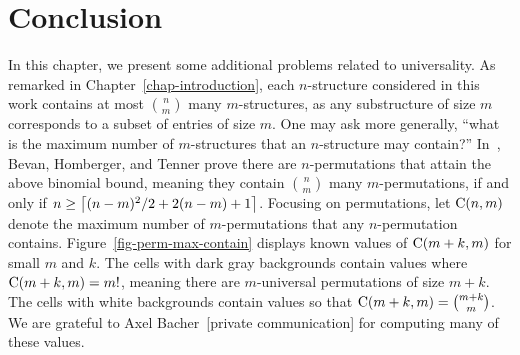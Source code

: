 \chapter{Conclusion}
\label{chap-conclusion}

In this chapter, we present some additional problems related to universality. As remarked in Chapter~\ref{chap-introduction}, each $n$-structure considered in this work contains at most $\binom{n}{m}$ many $m$-structures, as any substructure of size $m$ corresponds to a subset of entries of size $m$. One may ask more generally, ``what is the maximum number of $m$-structures that an $n$-structure may contain?'' In~\cite{bevan:prolific-permut:}, Bevan, Homberger, and Tenner prove there are $n$-permutations that attain the above binomial bound, meaning they contain $\binom{n}{m}$ many $m$-permutations, if and only if $n \ge {\left\lceil{(n-m)^2/2 + 2(n-m) + 1}\right\rceil}$.  Focusing on permutations, let $\operatorname{C}(n,m)$ denote the maximum number of $m$-permutations that any $n$-permutation contains. Figure~\ref{fig-perm-max-contain} displays known values of $\operatorname{C}(m+k,m)$ for small $m$ and $k$. The cells with dark gray backgrounds contain values where $\operatorname{C}(m+k,m) = m!$, meaning there are $m$-universal permutations of size $m+k$. The cells with white backgrounds contain values so that $\operatorname{C}(m+k,m) = \binom{m+k}{m}$. We are grateful to Axel Bacher~[private communication] for computing many of these values.

